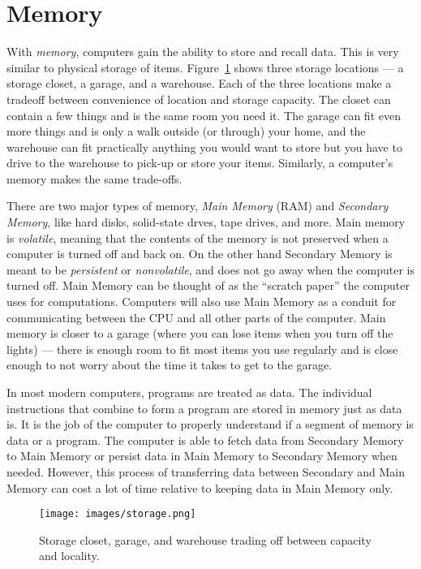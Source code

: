 \section{Memory}

With \emph{memory}, computers gain the ability to store and recall data. This is very
similar to physical storage of items. Figure~\ref{fig:hardware:storage} shows
three storage locations --- a storage closet, a garage, and a warehouse. Each of
the three locations make a tradeoff between convenience of location and storage
capacity. The closet can contain a few things and is the same room you need it.
The garage can fit even more things and is only a walk outside (or through) your
home, and the warehouse can fit practically anything you would want to store but
you have to drive to the warehouse to pick-up or store your items. Similarly, a
computer's memory makes the same trade-offs.

There are two major types of memory, \emph{Main Memory} (RAM) and \emph{Secondary Memory},
like hard disks, solid-state drves, tape drives, and more. Main memory is \emph{volatile},
meaning that the contents of the memory is not preserved when a computer is
turned off and back on. On the other hand Secondary Memory is meant to be
\emph{persistent} or \emph{nonvolatile}, and does not go away when the computer is turned off. Main Memory
can be thought of as the ``scratch paper'' the computer uses for computations.
Computers will also use Main Memory as a conduit for communicating between the
CPU and all other parts of the computer. Main memory is closer to a garage
(where you can lose items when you turn off the lights) --- there is enough room
to fit most items you use regularly and is close enough to not worry about the
time it takes to get to the garage.

In most modern computers,
programs are treated as data. The individual instructions that combine
to form a program are stored in memory just as data is. It is the job of the
computer to properly understand if a segment of memory is data or a program.
The computer is able to fetch data from Secondary Memory to Main Memory or
persist data in Main Memory to Secondary Memory when needed. However,
this process of transferring data between Secondary and Main Memory can
cost a lot of time relative to keeping data in Main Memory only.

\begin{figure}
	\centering
	\texttt{[image: images/storage.png]}
	\caption{Storage closet, garage, and warehouse trading off between
                 capacity and locality. }
	\label{fig:hardware:storage}
\end{figure}

